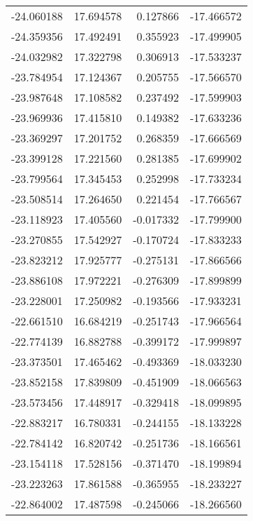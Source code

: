 \begin{tabular}{rrrr}
      -24.060188 &        17.694578 &    0.127866 & -17.466572 \\
      -24.359356 &        17.492491 &    0.355923 & -17.499905 \\
      -24.032982 &        17.322798 &    0.306913 & -17.533237 \\
      -23.784954 &        17.124367 &    0.205755 & -17.566570 \\
      -23.987648 &        17.108582 &    0.237492 & -17.599903 \\
      -23.969936 &        17.415810 &    0.149382 & -17.633236 \\
      -23.369297 &        17.201752 &    0.268359 & -17.666569 \\
      -23.399128 &        17.221560 &    0.281385 & -17.699902 \\
      -23.799564 &        17.345453 &    0.252998 & -17.733234 \\
      -23.508514 &        17.264650 &    0.221454 & -17.766567 \\
      -23.118923 &        17.405560 &   -0.017332 & -17.799900 \\
      -23.270855 &        17.542927 &   -0.170724 & -17.833233 \\
      -23.823212 &        17.925777 &   -0.275131 & -17.866566 \\
      -23.886108 &        17.972221 &   -0.276309 & -17.899899 \\
      -23.228001 &        17.250982 &   -0.193566 & -17.933231 \\
      -22.661510 &        16.684219 &   -0.251743 & -17.966564 \\
      -22.774139 &        16.882788 &   -0.399172 & -17.999897 \\
      -23.373501 &        17.465462 &   -0.493369 & -18.033230 \\
      -23.852158 &        17.839809 &   -0.451909 & -18.066563 \\
      -23.573456 &        17.448917 &   -0.329418 & -18.099895 \\
      -22.883217 &        16.780331 &   -0.244155 & -18.133228 \\
      -22.784142 &        16.820742 &   -0.251736 & -18.166561 \\
      -23.154118 &        17.528156 &   -0.371470 & -18.199894 \\
      -23.223263 &        17.861588 &   -0.365955 & -18.233227 \\
      -22.864002 &        17.487598 &   -0.245066 & -18.266560 \\

\end{tabular}
